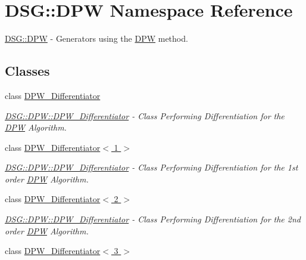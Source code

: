 \hypertarget{namespace_d_s_g_1_1_d_p_w}{\section{D\+S\+G\+:\+:D\+P\+W Namespace Reference}
\label{namespace_d_s_g_1_1_d_p_w}
}


\hyperlink{namespace_d_s_g_1_1_d_p_w}{D\+S\+G\+::\+D\+P\+W} -\/ Generators using the \hyperlink{namespace_d_s_g_1_1_d_p_w}{D\+P\+W} method.  


\subsection*{Classes}
\begin{DoxyCompactItemize}
\item 
class \hyperlink{class_d_s_g_1_1_d_p_w_1_1_d_p_w___differentiator}{D\+P\+W\+\_\+\+Differentiator}
\begin{DoxyCompactList}\small\item\em \hyperlink{class_d_s_g_1_1_d_p_w_1_1_d_p_w___differentiator}{D\+S\+G\+::\+D\+P\+W\+::\+D\+P\+W\+\_\+\+Differentiator} -\/ Class Performing Differentiation for the \hyperlink{namespace_d_s_g_1_1_d_p_w}{D\+P\+W} Algorithm. \end{DoxyCompactList}\item 
class \hyperlink{class_d_s_g_1_1_d_p_w_1_1_d_p_w___differentiator_3_011_01_4}{D\+P\+W\+\_\+\+Differentiator$<$ 1 $>$}
\begin{DoxyCompactList}\small\item\em \hyperlink{class_d_s_g_1_1_d_p_w_1_1_d_p_w___differentiator}{D\+S\+G\+::\+D\+P\+W\+::\+D\+P\+W\+\_\+\+Differentiator} -\/ Class Performing Differentiation for the 1st order \hyperlink{namespace_d_s_g_1_1_d_p_w}{D\+P\+W} Algorithm. \end{DoxyCompactList}\item 
class \hyperlink{class_d_s_g_1_1_d_p_w_1_1_d_p_w___differentiator_3_012_01_4}{D\+P\+W\+\_\+\+Differentiator$<$ 2 $>$}
\begin{DoxyCompactList}\small\item\em \hyperlink{class_d_s_g_1_1_d_p_w_1_1_d_p_w___differentiator}{D\+S\+G\+::\+D\+P\+W\+::\+D\+P\+W\+\_\+\+Differentiator} -\/ Class Performing Differentiation for the 2nd order \hyperlink{namespace_d_s_g_1_1_d_p_w}{D\+P\+W} Algorithm. \end{DoxyCompactList}\item 
class \hyperlink{class_d_s_g_1_1_d_p_w_1_1_d_p_w___differentiator_3_013_01_4}{D\+P\+W\+\_\+\+Differentiator$<$ 3 $>$}

\end{DoxyCompactItemize}
